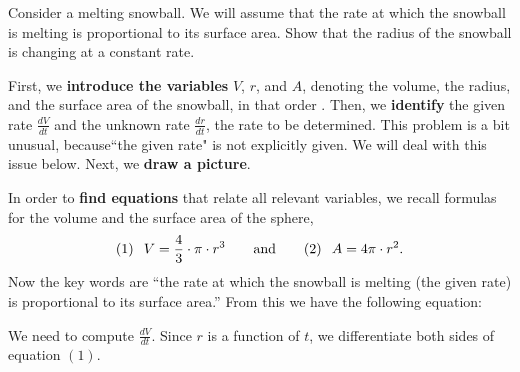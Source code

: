 \documentclass{ximera}
\begin{document}
\begin{example}
  Consider a melting snowball. We will assume that the rate at which the
  snowball is melting is proportional to its surface area. Show that
  the radius of the snowball is changing at a constant rate.

\begin{explanation}
First, we \textbf{introduce the variables} $V$, $r$, and $A$, denoting the volume, the radius, and the surface area of the snowball, in that order . Then, we \textbf{identify} the given rate $\frac{dV}{dt}$  and the unknown rate $\frac{dr}{dt}$, the rate to be determined. This problem is a bit unusual, because``the given  rate" is not explicitly given. We will deal with this issue below.
  Next, we \textbf{draw a picture}.
  \begin{image}
  \end{image}
  In order to \textbf{find equations} that relate all relevant variables, we recall formulas for the  volume and the surface area of the sphere,
  \[
(1) \hspace{0.1in} V =\frac{4}{3} \cdot \pi \cdot r^3 \qquad\text{and}\qquad  (2) \hspace{0.1in} A = 4
  \pi \cdot r^2.
  \]
  Now the key words are ``the rate at which the snowball is melting (the given rate) is
  proportional to its surface area.'' From this we have the following
  equation:
  \begin{image}
  \end{image}
  We need to compute  $\frac{dV}{dt}$. Since $r$ is a function of $t$, we  differentiate both sides of equation $(1)$.

\end{explanation}
\end{example}
\end{document}

